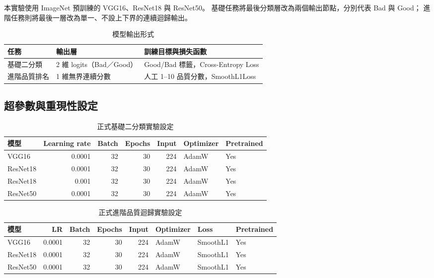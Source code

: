 \documentclass[12pt,a4paper,fontset=none]{ctexart}
\begin{document}
本實驗使用 ImageNet 預訓練的 VGG16、ResNet18 與 ResNet50。
基礎任務將最後分類層改為兩個輸出節點，分別代表 Bad 與 Good；
進階任務則將最後一層改為單一、不設上下界的連續迴歸輸出。

\begin{table}[H]
  \centering
  \caption{模型輸出形式}
  \label{tab:model-output}
  \begin{tabularx}{\linewidth}{lXX}
    \toprule
    任務 & 輸出層 & 訓練目標與損失函數 \\
    \midrule
    基礎二分類 &
    2 維 logits（Bad／Good） &
    Good/Bad 標籤，Cross-Entropy Loss \\
    進階品質排名 &
    1 維無界連續分數 &
    人工 1--10 品質分數，SmoothL1Loss \\
    \bottomrule
  \end{tabularx}
\end{table}

\subsection{超參數與重現性設定}
\label{subsec:hyperparameters}

\begin{table}[H]
  \centering
  \caption{正式基礎二分類實驗設定}
  \label{tab:binary-configs}
  \begin{tabular}{lrrrrll}
    \toprule
    模型 & Learning rate & Batch & Epochs & Input & Optimizer & Pretrained \\
    \midrule
    VGG16 & 0.0001 & 32 & 30 & 224 & AdamW & Yes \\
    ResNet18 & 0.0001 & 32 & 30 & 224 & AdamW & Yes \\
    ResNet18 & 0.001 & 32 & 30 & 224 & AdamW & Yes \\
    ResNet50 & 0.0001 & 32 & 30 & 224 & AdamW & Yes \\
    \bottomrule
  \end{tabular}
\end{table}

\begin{table}[H]
  \centering
  \caption{正式進階品質迴歸實驗設定}
  \label{tab:ranking-configs}
  \begin{tabular}{lrrrrlll}
    \toprule
    模型 & LR & Batch & Epochs & Input & Optimizer & Loss & Pretrained \\
    \midrule
    VGG16 & 0.0001 & 32 & 30 & 224 & AdamW & SmoothL1 & Yes \\
    ResNet18 & 0.0001 & 32 & 30 & 224 & AdamW & SmoothL1 & Yes \\
    ResNet50 & 0.0001 & 32 & 30 & 224 & AdamW & SmoothL1 & Yes \\
    \bottomrule
  \end{tabular}
\end{table}
\end{document}

